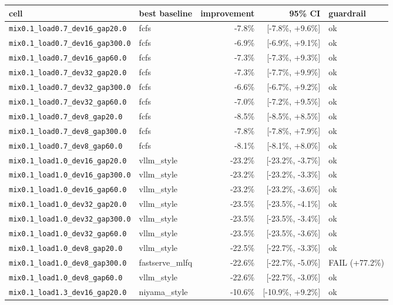 \begin{longtable}{llrrl}
\toprule
cell & best baseline & improvement & 95\% CI & guardrail \\
\midrule
\endhead
\texttt{mix0.1\_load0.7\_dev16\_gap20.0} & fcfs & -7.8\% & [-7.8\%, +9.6\%] & ok \\
\texttt{mix0.1\_load0.7\_dev16\_gap300.0} & fcfs & -6.9\% & [-6.9\%, +9.1\%] & ok \\
\texttt{mix0.1\_load0.7\_dev16\_gap60.0} & fcfs & -7.3\% & [-7.3\%, +9.3\%] & ok \\
\texttt{mix0.1\_load0.7\_dev32\_gap20.0} & fcfs & -7.3\% & [-7.7\%, +9.9\%] & ok \\
\texttt{mix0.1\_load0.7\_dev32\_gap300.0} & fcfs & -6.6\% & [-6.7\%, +9.2\%] & ok \\
\texttt{mix0.1\_load0.7\_dev32\_gap60.0} & fcfs & -7.0\% & [-7.2\%, +9.5\%] & ok \\
\texttt{mix0.1\_load0.7\_dev8\_gap20.0} & fcfs & -8.5\% & [-8.5\%, +8.5\%] & ok \\
\texttt{mix0.1\_load0.7\_dev8\_gap300.0} & fcfs & -7.8\% & [-7.8\%, +7.9\%] & ok \\
\texttt{mix0.1\_load0.7\_dev8\_gap60.0} & fcfs & -8.1\% & [-8.1\%, +8.0\%] & ok \\
\texttt{mix0.1\_load1.0\_dev16\_gap20.0} & vllm\_style & -23.2\% & [-23.2\%, -3.7\%] & ok \\
\texttt{mix0.1\_load1.0\_dev16\_gap300.0} & vllm\_style & -23.2\% & [-23.2\%, -3.3\%] & ok \\
\texttt{mix0.1\_load1.0\_dev16\_gap60.0} & vllm\_style & -23.2\% & [-23.2\%, -3.6\%] & ok \\
\texttt{mix0.1\_load1.0\_dev32\_gap20.0} & vllm\_style & -23.5\% & [-23.5\%, -4.1\%] & ok \\
\texttt{mix0.1\_load1.0\_dev32\_gap300.0} & vllm\_style & -23.5\% & [-23.5\%, -3.4\%] & ok \\
\texttt{mix0.1\_load1.0\_dev32\_gap60.0} & vllm\_style & -23.5\% & [-23.5\%, -3.6\%] & ok \\
\texttt{mix0.1\_load1.0\_dev8\_gap20.0} & vllm\_style & -22.5\% & [-22.7\%, -3.3\%] & ok \\
\texttt{mix0.1\_load1.0\_dev8\_gap300.0} & fastserve\_mlfq & -22.6\% & [-22.7\%, -5.0\%] & FAIL (+77.2\%) \\
\texttt{mix0.1\_load1.0\_dev8\_gap60.0} & vllm\_style & -22.6\% & [-22.7\%, -3.0\%] & ok \\
\texttt{mix0.1\_load1.3\_dev16\_gap20.0} & niyama\_style & -10.6\% & [-10.9\%, +9.2\%] & ok \\

\end{longtable}
